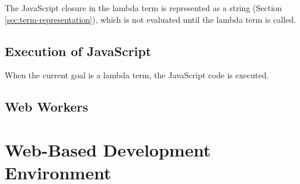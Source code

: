 The JavaScript closure in the lambda term is represented as a string (Section \ref{sec:term-representation}), which is not evaluated until the lambda term is called.

\subsection{Execution of JavaScript}

When the current goal is a lambda term, the JavaScript code is executed.


\subsection{Web Workers}

\section{Web-Based Development Environment}